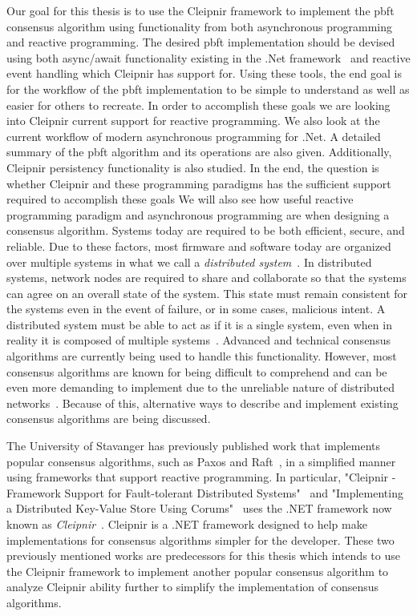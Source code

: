 Our goal for this thesis is to use the Cleipnir framework to implement the \acl{pbft} consensus algorithm using functionality from both asynchronous programming and reactive programming. The desired \ac{pbft} implementation should be devised using both async/await functionality existing in the .Net framework~\cite{DOC:AsyncAwait} and reactive event handling which Cleipnir has support for. Using these tools, the end goal is for the workflow of the \ac{pbft} implementation to be simple to understand as well as easier for others to recreate. In order to accomplish these goals we are looking into Cleipnir current support for reactive programming. We also look at the current workflow of modern asynchronous programming for .Net. A detailed summary of the \ac{pbft} algorithm and its operations are also given. Additionally, Cleipnir persistency functionality is also studied.
In the end, the question is whether Cleipnir and these programming paradigms has the sufficient support required to accomplish these goals We will also see how useful reactive programming paradigm and asynchronous programming are when designing a consensus algorithm.
\fi
Systems today are required to be both efficient, secure, and reliable. Due to these factors, most firmware and software today are organized over multiple systems in what we call a \textit{distributed system}~\cites{WEB:DistSys}[p.~16]{BOOK:MVstandver3}. In distributed systems, network nodes are required to share and collaborate so that the systems can agree on an overall state of the system. This state must remain consistent for the systems even in the event of failure, or in some cases, malicious intent. A distributed system must be able to act as if it is a single system, even when in reality it is composed of multiple systems~\cite[p.~18]{BOOK:MVstandver3}. Advanced and technical consensus algorithms are currently being used to handle this functionality.
However, most consensus algorithms are known for being difficult to comprehend and can be even more demanding to implement due to the unreliable nature of distributed networks~\cites[p.~459]{BOOK:MVstandver3}[p.~13]{PAPER:EivindPaper}. Because of this, alternative ways to describe and implement existing consensus algorithms are being discussed.

The University of Stavanger has previously published work that implements popular consensus algorithms, such as Paxos and Raft~\cite{WEB:ConsesAlgo}, in a simplified manner using frameworks that support reactive programming. In particular, "Cleipnir - Framework Support for Fault-tolerant Distributed Systems"~\cite{PAPER:PaxosCleipnir} and "Implementing a Distributed Key-Value Store Using Corums"~\cite{PAPER:EivindPaper} uses the .NET framework now known as \textit{Cleipnir}~\cite{DOC:Cleipnir}.
Cleipnir is a .NET framework designed to help make implementations for consensus algorithms simpler for the developer.
These two previously mentioned works are predecessors for this thesis which intends to use the Cleipnir framework to implement another popular consensus algorithm to analyze Cleipnir ability further to simplify the implementation of consensus algorithms.

